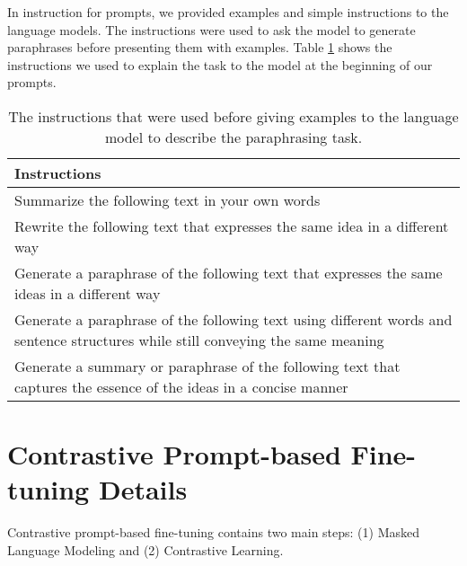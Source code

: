 \documentclass[11pt]{article}
\begin{document}
In instruction for prompts, we provided examples and simple instructions to the language models. The instructions were used to ask the model to generate paraphrases before presenting them with examples. Table \ref{table:examplewithinstruction} shows the instructions we used to explain the task to the model at the beginning of our prompts.

\begin{table}[!ht]
    \centering 
    \begin{tabular}{>{\centering\arraybackslash}p{3in}}
    \textbf{Instructions}                               \\ \hline
    Summarize the following text in your own words \\ \hline
    Rewrite the following text that expresses the same idea in a different way\\  \hline
    Generate a paraphrase of the following text that expresses the same ideas in a different way \\ \hline
    Generate a paraphrase of the following text using different words and sentence structures while still conveying the same meaning\\ \hline
    Generate a summary or paraphrase of the following text that captures the essence of the ideas in a concise manner\\ 
    \end{tabular}
    \caption{The instructions that were used before giving examples to the language model to describe the paraphrasing task.}
    \label{table:examplewithinstruction}
\end{table}

\section{Contrastive Prompt-based Fine-tuning Details}
\label{appendix:contrastive prompt-based fine-tuning details}

Contrastive prompt-based fine-tuning contains two main steps: (1) Masked Language Modeling and (2) Contrastive Learning.
\end{document}
